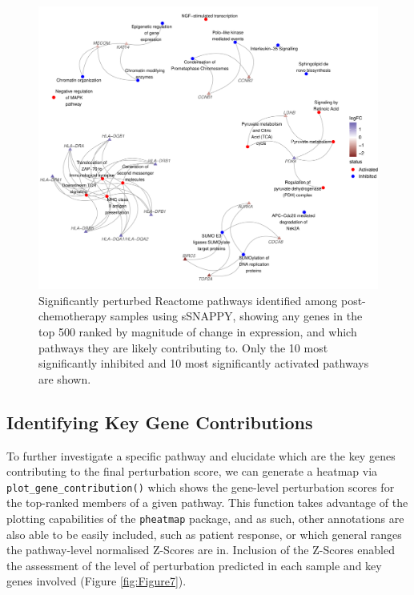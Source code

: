 \documentclass[9pt,a4paper,]{extarticle}
\begin{document}
\begin{figure}

{\centering \includegraphics[width=1\linewidth]{sSNAPPY_paper_files/figure-latex/Figure6-1} 

}

\caption{Significantly perturbed Reactome pathways identified among post-chemotherapy samples using sSNAPPY, showing any genes in the top 500 ranked by magnitude of change in expression, and which pathways they are likely contributing to. Only the 10 most significantly inhibited and 10 most significantly activated pathways are shown.}\label{fig:Figure6}
\end{figure}

\hypertarget{identifying-key-gene-contributions}{%
\subsection{Identifying Key Gene Contributions}\label{identifying-key-gene-contributions}}

To further investigate a specific pathway and elucidate which are the key genes contributing to the final perturbation score, we can generate a heatmap via \texttt{plot\_gene\_contribution()} which shows the gene-level perturbation scores for the top-ranked members of a given pathway.
This function takes advantage of the plotting capabilities of the \texttt{pheatmap} package\citep{pheatmap}, and as such, other annotations are also able to be easily included, such as patient response, or which general ranges the pathway-level normalised Z-Scores are in.
Inclusion of the Z-Scores enabled the assessment of the level of perturbation predicted in each sample and key genes involved (Figure \ref{fig:Figure7}).
\end{document}
